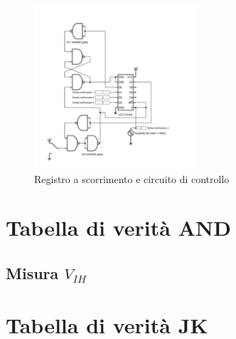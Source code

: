 \documentclass[journal]{IEEEtran}
\begin{document}
\begin{figure}[H]%
\begin{center}
\includegraphics[width=0.54\textwidth]{sch-simulations/digital/output/shift-register.pdf}
\caption{Registro a scorrimento e circuito di controllo}
\label{fig:circuit_shift_register}
\end{center}
\end{figure}



\section{Tabella di verità AND}

\subsection{Misura $V_{IH}$ }


\section{Tabella di verità JK}



\end{document}
